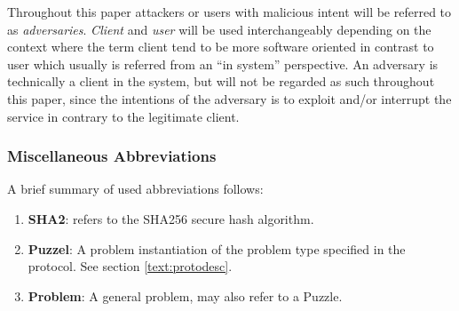 Throughout this paper attackers or users with malicious intent will be referred to as \emph{adversaries}.
\emph{Client} and \emph{user} will be used interchangeably depending on the context where the term client tend to be more software oriented in contrast to user which usually is referred from an ``in system'' perspective.
An adversary is technically a client in the system, but will not be regarded as such throughout this paper, since the intentions of the adversary is to exploit and/or interrupt the service in contrary to the legitimate client. 

\subsubsection*{Miscellaneous Abbreviations}
A brief summary of used abbreviations follows:
\begin{enumerate}
\item {\textbf{ SHA2}}: refers to the SHA256 secure hash algorithm\cite{sha2}.
\item \textbf{ Puzzel}: A problem instantiation of the problem type specified in the protocol. See section \ref{text:protodesc}.
\item \textbf{ Problem}: A general problem, may also refer to a Puzzle.
\end{enumerate}